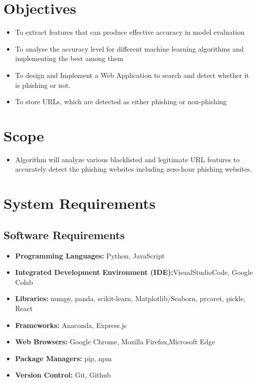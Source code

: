 \section{Objectives}

\begin{itemize}
    \item To extract features that can produce effective accuracy in model evaluation
\item To analyse the accuracy level for different machine learning algorithms and implementing the best among them
\item To design and Implement a Web Application to search and detect whether it is phishing or not.
\item To store URLs, which are detected as either phishing or non-phishing

\end{itemize}
\section{Scope}
\begin{itemize}
    \item Algorithm will analyze various blacklisted and legitimate URL features to accurately detect the phishing websites including zero-hour phishing websites.

\end{itemize}

\section{System Requirements}
\subsection{  Software Requirements  }
\renewcommand{\labelitemi}{}

\begin{itemize}
    \item \textbf{Programming Languages:} Python, JavaScript
    \item \textbf{Integrated Development Environment (IDE):}VisualStudioCode, Google Colab
    \item \textbf{Libraries:} numpy, panda, scikit-learn, Matplotlib/Seaborn, pycaret, pickle, React
    \item \textbf{Frameworks:} Anaconda, Express.js
    \item \textbf{Web Browsers:} Google Chrome, Mozilla Firefox,Microsoft Edge
    \item \textbf{Package Managers:} pip, npm
    \item \textbf{Version Control:} Git, Github
\end{itemize}


